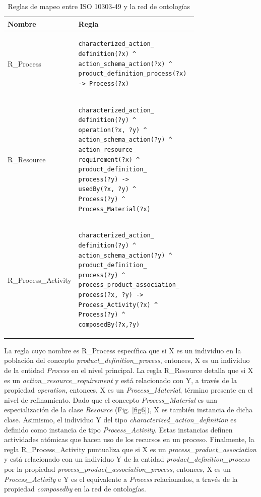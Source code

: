 \documentclass[journal]{IEEEtran}
\begin{document}
\begin{table}[!t]
\renewcommand{\arraystretch}{1.3}
\caption{Reglas de mapeo entre ISO 10303-49 y la red de ontolog\'ias}
\label{tabla6}
\centering
\begin{tabular}{p{2.5cm}p{5cm}}
\hline
\hline
 Nombre &  Regla \\
\hline
R\_Process & \begin{verbatim}characterized_action_
definition(?x) ^ 
action_schema_action(?x) ^ 
product_definition_process(?x) 
-> Process(?x) \end{verbatim}  \\ \cline{1-2}
R\_Resource & \begin{verbatim}characterized_action_
definition(?y) ^ 
operation(?x, ?y) ^ 
action_schema_action(?y) ^ 
action_resource_
requirement(?x) ^ 
product_definition_
process(?y) -> 
usedBy(?x, ?y) ^ 
Process(?y) ^ 
Process_Material(?x) \end{verbatim} \\ \cline{1-2}
R\_Process\_Activity & \begin{verbatim}characterized_action_
definition(?y) ^ 
action_schema_action(?y) ^ 
product_definition_
process(?y) ^ 
process_product_association_
process(?x, ?y) -> 
Process_Activity(?x) ^ 
Process(?y) ^ 
composedBy(?x,?y) \end{verbatim} \\  \hline \hline   
\end{tabular}
\end{table}

La regla cuyo nombre es R\_Process espec\'ifica que si X es un individuo en la poblaci\'on del concepto \emph{product\_definition\_process}, entonces, X es un individuo de la entidad \emph{Process} en el nivel principal. La regla R\_Resource detalla que si X es un \emph{action\_resource\_requirement} y est\'a relacionado con Y, a trav\'es de la propiedad \emph{operation}, entonces, X es un \emph{Process\_Material}, t\'ermino presente en el nivel de refinamiento. Dado que el concepto \emph{Process\_Material} es una especializaci\'on de la clase \emph{Resource} (Fig. \ref{fig6}), X es tambi\'en instancia de dicha clase. Asimismo, el individuo Y del tipo \emph{characterized\_action\_definition} es definido como instancia de tipo \emph{Process\_Activity}. Estas instancias definen actividades at\'omicas que hacen uso de los recursos en un proceso. Finalmente, la regla R\_Process\_Activity puntualiza que si X es un \emph{process\_product\_association} y est\'a relacionado con un individuo Y de la entidad \emph{product\_definition\_process} por la propiedad \emph{process\_product\_association\_process}, entonces, X es un \emph{Process\_Activity} e Y es el equivalente a \emph{Process} relacionados, a trav\'es de la propiedad \emph{composedby} en la red de ontolog\'ias. 
\end{document}
